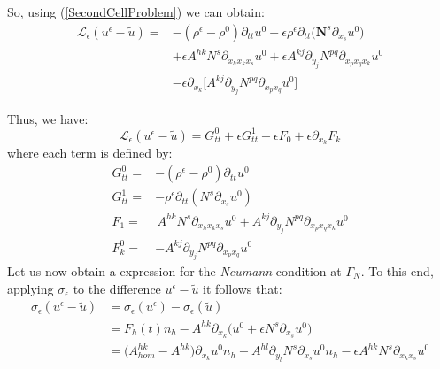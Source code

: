 So, using (\ref{SecondCellProblem}) we can obtain:
\begin{align*}
    \mathcal{L}_{\epsilon} (u^{\epsilon} -\tilde{u})  = & - (\rho^{\epsilon}-\rho^0) \partial_{tt} u^0 - \epsilon \rho^{\epsilon} \partial_{tt}\big(\mathbf{N}^s \partial_{x_s}u^0 \big)  \\
    & + \epsilon A^{hk} N^s \partial_{x_h x_k x_s} u^0 + \epsilon A^{kj} \partial_{y_j} N^{pq} \partial_{x_p x_q x_k} u^0  \\
    & - \epsilon \partial_{x_k} \big[ A^{kj} \partial_{y_j} N^{pq} \partial_{x_p x_q} u^0\big] 
\end{align*}

Thus, we have:
\begin{equation}
    \mathcal{L}_{\epsilon} (u^{\epsilon}-\tilde{u}) = G_{tt}^0 + \epsilon G_{tt}^1 + \epsilon F_0 + \epsilon \partial_{x_k} F_k
\end{equation}
where each term is defined by:
\begin{equation}
    \label{Variables}
    \begin{aligned}
        G_{tt}^0 = & -(\rho^{\epsilon} - \rho^0) \partial_{tt}u^0 \\
        G_{tt}^1 = & -\rho^{\epsilon} \partial_{tt}(N^s \partial_{x_s} u^0) \\
        F_1 = & \, A^{hk}N^s \partial_{x_h x_k x_s} u^0  + A^{kj}\partial_{y_j} N^{pq} \partial_{x_p x_q x_k} u^0 \\
        F^0_k = & - A^{kj} \partial_{y_j} N^{pq} \partial_{x_p x_q} u^0 
    \end{aligned}
\end{equation}
Let us now obtain a expression for the \textit{Neumann} condition at $\Gamma_N$. To this end, applying $\sigma_{\epsilon}$ to the difference $u^{\epsilon} - \tilde{u}$ it follows that:
\begin{align*}
    \sigma_{\epsilon} (u^{\epsilon} - \tilde{u}) & =  \sigma_{\epsilon}(u^{\epsilon}) - \sigma_{\epsilon} (\tilde{u}) \\
    & = F_h(t) n_h - A^{hk} \partial_{x_k} \big( u^0 + \epsilon N^s \partial_{x_s}u^0 \big) \\
    & = \big(A^{hk}_{hom} - A^{hk} \big) \partial_{x_k} u^0 n_h - A^{hl} \partial_{y_l} N^s \partial_{x_s} u^0 n_h - \epsilon A^{hk} N^s \partial_{x_k x_s} u^0 
\end{align*}

